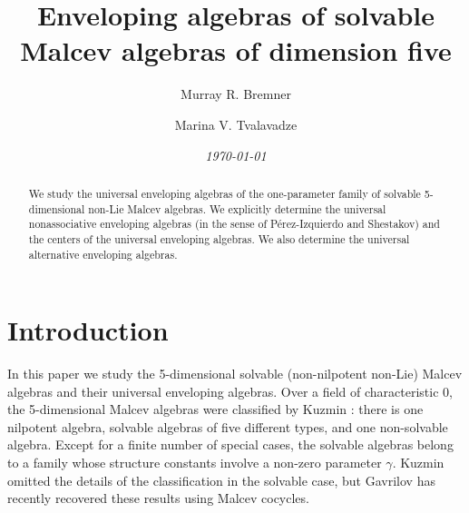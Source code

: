 \documentclass{amsart}
\theoremstyle{plain}
\theoremstyle{definition}
\begin{document}
\title[Enveloping algebras of solvable Malcev algebras]
{Enveloping algebras of solvable Malcev algebras of dimension five}

\author[Bremner]{Murray R. Bremner}

\address{Department of Mathematics and Statistics,
University of Saskatchewan, Canada}


\author[Tvalavadze]{Marina V. Tvalavadze}

\address{Department of Mathematics and Statistics,
University of Saskatchewan, Canada}


\date{\textit{\today}}

\begin{abstract}
We study the universal enveloping algebras of the one-parameter family of
solvable 5-dimensional non-Lie Malcev algebras.  We explicitly determine the
universal nonassociative enveloping algebras (in the sense of P\'erez-Izquierdo
and Shestakov) and the centers of the universal enveloping algebras.  We also
determine the universal alternative enveloping algebras.
\end{abstract}



\maketitle

\section{Introduction}

In this paper we study the 5-dimensional solvable (non-nilpotent non-Lie)
Malcev algebras and their universal enveloping algebras. Over a field of
characteristic 0, the 5-dimensional Malcev algebras were classified by Kuzmin
\cite{Kuzmin}: there is one nilpotent algebra, solvable algebras of five
different types, and one non-solvable algebra. Except for a finite number of
special cases, the solvable algebras belong to a family whose structure
constants involve a non-zero parameter $\gamma$. Kuzmin omitted the details of
the classification in the solvable case, but Gavrilov \cite{Gavrilov} has
recently recovered these results using Malcev cocycles.
\end{document}
